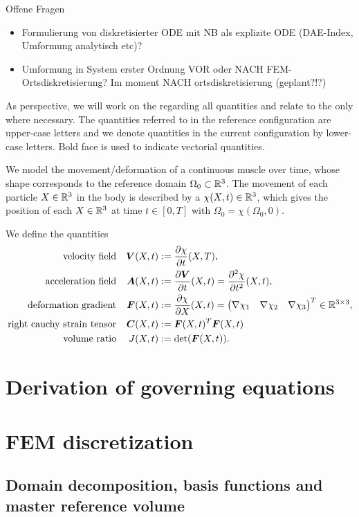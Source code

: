 \documentclass[a4paper,11pt]{article}
\newcommand{\Or}{\Omega_0}
\newcommand{\m}[1]{\ensuremath{\left(\begin{matrix}#1\end{matrix}\right)}}
\begin{document}
Offene Fragen
\begin{itemize}
  \item Formulierung von diskretisierter ODE mit NB als explizite ODE (DAE-Index, Umformung analytisch etc)?
  \item Umformung in System erster Ordnung VOR oder NACH FEM-Ortsdiskretisierung?
  Im moment NACH ortsdiskretisierung (geplant?!?)
\end{itemize}

As perspective, we will work on the  regarding all quantities and relate to the  only where necessary.
The quantities referred to in the reference configuration are upper-case letters and we denote quantities in the current configuration by lower-case letters.
Bold face is used to indicate vectorial quantities.

We model the movement/deformation of a continuous muscle over time, whose shape corresponds to the reference domain $\Or\subset\R^3$.
The movement of each particle $X\in\mathbb{R}^3$ in the body is described by a  $\chi(X,t)\in\mathbb{R}^3$, which gives the position of each $X\in\mathbb{R}^3$ at time
$t\in[0,T]$ with $\Or = \chi(\Or,0)$.

We define the quantities
\begin{align}
	\text{velocity field} && \vV(X,t) &:= \d{\chi}{t}(X,T),\\
	\text{acceleration field} && \vA(X,t) &:= \d{\vV}{t}(X,t) = \dd{\chi}{t}(X,t),\\
	\text{deformation gradient} && \vF(X,t) &:= \d{\chi}{X}(X,t) = \m{\nabla \chi_1 & \nabla \chi_2 & \nabla \chi_3}^T \in \R^{3\times 3},\\
	\text{right cauchy strain tensor} && \vC(X,t) &:= \vF(X,t)^T\vF(X,t)\\
	\text{volume ratio} && J(X,t) &:= \det(\vF(X,t)).
\end{align}

\section{Derivation of governing equations}


\section{FEM discretization}

\subsection{Domain decomposition, basis functions and master reference volume}

\end{document}

